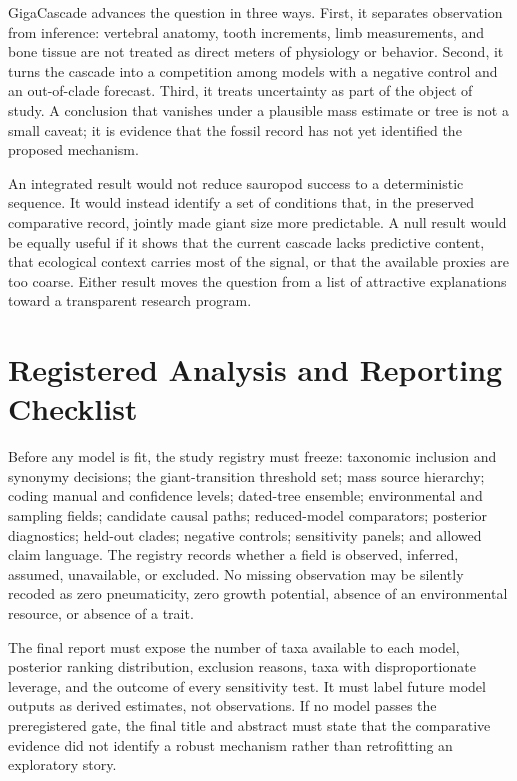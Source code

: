 \documentclass[conference]{IEEEtran}
\newcommand{\gc}{GigaCascade}
\begin{document}
\gc{} advances the question in three ways. First, it separates observation from inference: vertebral anatomy, tooth increments, limb measurements, and bone tissue are not treated as direct meters of physiology or behavior. Second, it turns the cascade into a competition among models with a negative control and an out-of-clade forecast. Third, it treats uncertainty as part of the object of study. A conclusion that vanishes under a plausible mass estimate or tree is not a small caveat; it is evidence that the fossil record has not yet identified the proposed mechanism.

An integrated result would not reduce sauropod success to a deterministic sequence. It would instead identify a set of conditions that, in the preserved comparative record, jointly made giant size more predictable. A null result would be equally useful if it shows that the current cascade lacks predictive content, that ecological context carries most of the signal, or that the available proxies are too coarse. Either result moves the question from a list of attractive explanations toward a transparent research program.

\appendices
\section{Registered Analysis and Reporting Checklist}

Before any model is fit, the study registry must freeze: taxonomic inclusion and synonymy decisions; the giant-transition threshold set; mass source hierarchy; coding manual and confidence levels; dated-tree ensemble; environmental and sampling fields; candidate causal paths; reduced-model comparators; posterior diagnostics; held-out clades; negative controls; sensitivity panels; and allowed claim language. The registry records whether a field is observed, inferred, assumed, unavailable, or excluded. No missing observation may be silently recoded as zero pneumaticity, zero growth potential, absence of an environmental resource, or absence of a trait.

The final report must expose the number of taxa available to each model, posterior ranking distribution, exclusion reasons, taxa with disproportionate leverage, and the outcome of every sensitivity test. It must label future model outputs as derived estimates, not observations. If no model passes the preregistered gate, the final title and abstract must state that the comparative evidence did not identify a robust mechanism rather than retrofitting an exploratory story.
\end{document}
